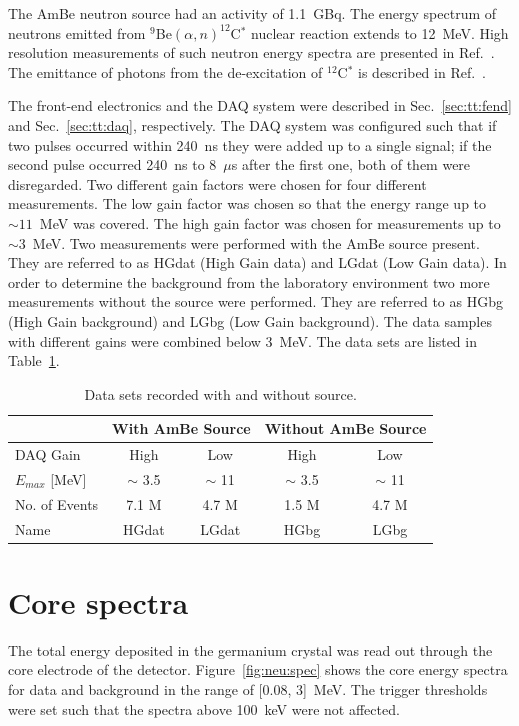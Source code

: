 The AmBe neutron source had an activity of 1.1~GBq. The energy
spectrum of neutrons emitted from $^{9}$Be$(\alpha,n)^{12}$C$^{*}$
nuclear reaction extends to 12~MeV. High resolution measurements of
such neutron energy spectra are presented in Ref.~\cite{Mar95,
Gei75}. The emittance of photons from the de-excitation of
$^{12}$C$^{*}$ is described in Ref.~\cite{Gei75}.

The front-end electronics and the DAQ system were described in
Sec.~\ref{sec:tt:fend} and Sec.~\ref{sec:tt:daq}, respectively. The
DAQ system was configured such that if two pulses occurred within
240~ns they were added up to a single signal; if the second pulse
occurred 240~ns to 8~$\mu$s after the first one, both of them were
disregarded. Two different gain factors were chosen for four different
measurements. The low gain factor was chosen so that the energy range
up to $\sim 11$~MeV was covered. The high gain factor was chosen for
measurements up to $\sim 3$~MeV. Two measurements were performed with
the AmBe source present. They are referred to as HGdat (High Gain
data) and LGdat (Low Gain data). In order to determine the background
from the laboratory environment two more measurements without the
source were performed. They are referred to as HGbg (High Gain
background) and LGbg (Low Gain background). The data samples with
different gains were combined below 3~MeV. The data sets are listed in
Table~\ref{tab:neu:datset}.

\begin{table}[tbhp]
\centering
\caption{Data sets recorded with and without source.} 
\label{tab:neu:datset}
\begin{tabular}{lcccc}\hline
& \multicolumn{2}{c}{With AmBe Source} & 
\multicolumn{2}{c}{Without AmBe Source} \\\hline
DAQ Gain & High  & Low   & High  & Low  \\
$E_{max}$ [MeV] & $\sim$ 3.5  & $\sim$ 11 & $\sim$ 3.5 & $\sim$ 11 \\
No. of Events & 7.1 M & 4.7 M & 1.5 M & 4.7 M \\
Name & HGdat & LGdat & HGbg & LGbg \\\hline
\end{tabular}
\end{table}

\section{Core spectra}
\label{sec:neu:spec}
The total energy deposited in the germanium crystal was read out
through the core electrode of the detector. Figure~\ref{fig:neu:spec}
shows the core energy spectra for data and background in the range of
[0.08, 3]~MeV. The trigger thresholds were set such that the spectra
above 100~keV were not affected.


